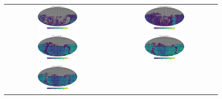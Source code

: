\documentclass[preprintm,linenumbers]{aastex631}
\begin{document}
  		\begin{figure}
			\centering
			\begin{tabular}{c c}
				\includegraphics[width=0.4\textwidth]{results/skymaps/skymap_first_year_one_snap_v4_0_10yrs_db_noDD_noTwi_tscale-28_nside-256_doAllTemplateMetrics_reduceCount_u_noDD_noTwi.pdf} &
				\includegraphics[width=0.4\textwidth]{results/skymaps/skymap_first_year_one_snap_v4_0_10yrs_db_noDD_noTwi_tscale-28_nside-256_doAllTemplateMetrics_reduceCount_g_noDD_noTwi.pdf} \\
				\includegraphics[width=0.4\textwidth]{results/skymaps/skymap_first_year_one_snap_v4_0_10yrs_db_noDD_noTwi_tscale-28_nside-256_doAllTemplateMetrics_reduceCount_r_noDD_noTwi.pdf} &
				\includegraphics[width=0.4\textwidth]{results/skymaps/skymap_first_year_one_snap_v4_0_10yrs_db_noDD_noTwi_tscale-28_nside-256_doAllTemplateMetrics_reduceCount_i_noDD_noTwi.pdf} \\
				\includegraphics[width=0.4\textwidth]{results/skymaps/skymap_first_year_one_snap_v4_0_10yrs_db_noDD_noTwi_tscale-28_nside-256_doAllTemplateMetrics_reduceCount_z_noDD_noTwi.pdf} &

\end{tabular}
\end{figure}
\end{document}
